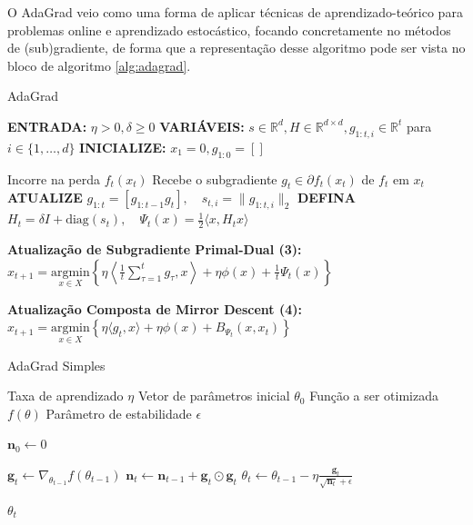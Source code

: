 O AdaGrad veio como uma forma de aplicar técnicas de aprendizado-teórico para problemas online e aprendizado estocástico, focando concretamente no métodos de (sub)gradiente, de forma que a representação desse algoritmo pode ser vista no bloco de algoritmo \ref{alg:adagrad}.

\begin{algorithm}[H]
    \caption{AdaGrad}
    \label{alg:adagrad}
    \begin{algorithmic}[1]

    \State \textbf{ENTRADA:} $\eta > 0, \delta \ge 0$
    \State \textbf{VARIÁVEIS:} $s \in \mathbb{R}^d, H \in \mathbb{R}^{d \times d}, g_{1:t,i} \in \mathbb{R}^t$ para $i \in \{1,\dots,d\}$
    \State \textbf{INICIALIZE:} $x_1 = 0, g_{1:0} = []$

        \State Incorre na perda $f_t(x_t)$
        \State Recebe o subgradiente $g_t \in \partial f_t(x_t)$ de $f_t$ em $x_t$
        \State \textbf{ATUALIZE} $g_{1:t} = [g_{1:t-1} g_t], \quad s_{t,i} = \|g_{1:t,i}\|_2$
        \State \textbf{DEFINA} $H_t = \delta I + \text{diag}(s_t), \quad \Psi_t(x) = \frac{1}{2}\langle x, H_t x \rangle$
    \EndFor

    \State
    \State \textbf{Atualização de Subgradiente Primal-Dual (3):}
    \State $x_{t+1} = \underset{x \in X}{\text{argmin}} \left\{ \eta \left\langle \frac{1}{t} \sum_{\tau=1}^t g_\tau, x \right\rangle + \eta \phi(x) + \frac{1}{t} \Psi_t(x) \right\}$

    \State
    \State \textbf{Atualização Composta de Mirror Descent (4):}
    \State $x_{t+1} = \underset{x \in X}{\text{argmin}} \left\{ \eta \langle g_t, x \rangle + \eta \phi(x) + B_{\Psi_t}(x, x_t) \right\}$

    \end{algorithmic}
\end{algorithm}

\begin{algorithm}[H] %
    \caption{AdaGrad Simples}
    \label{alg:adagrad-simples}
    \begin{algorithmic}[1] %

    \Require Taxa de aprendizado $\eta$
    \Require Vetor de parâmetros inicial $\theta_0$
    \Require Função a ser otimizada $f(\theta)$
    \Require Parâmetro de estabilidade $\epsilon$

    \State $\mathbf{n}_0 \leftarrow 0$ 

        \State $\textbf{g}_t \leftarrow \nabla_{\theta_{t-1}} f(\theta_{t-1})$
        \State $\textbf{n}_t \leftarrow \textbf{n}_{t-1} + \mathbf{g}_t \odot \mathbf{g}_t$
        \State $\theta_t \leftarrow \theta_{t-1} - \eta \frac{\textbf{g}_t}{\sqrt{\textbf{n}_t} + \epsilon}$
    \EndWhile

    \State \Return $\theta_t$ 
    \end{algorithmic}
\end{algorithm}


